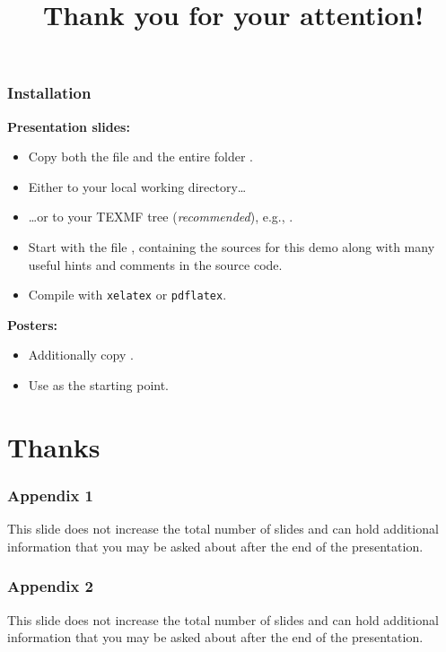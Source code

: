 \documentclass[11pt,t,usepdftitle=false,aspectratio=169]{beamer}
\begin{document}
\begin{frame}[fragile]
\frametitle{Installation}

   \textbf{Presentation slides:}
   \begin{itemize}
      \item Copy both the file  and the entire folder .

      \item Either to your local working directory\dots

      \item \dots or to your TEXMF tree (\emph{recommended}), e.g., .

      \item Start with the file , containing the sources for this demo
        along with many useful hints and comments in the source code.

      \item Compile with \texttt{xelatex} or \texttt{pdflatex}.
   \end{itemize}

\medskip

   \textbf{Posters:}
   \begin{itemize}
      \item Additionally copy .
      \item Use  as the starting point.
   \end{itemize}

\end{frame}


\title{Thank you for your attention!}
\subtitle{}
\section{Thanks}


\appendix

\begin{frame}
\frametitle{Appendix 1}
    This slide does not increase the total number of slides and can hold additional information
    that you may be asked about after the end of the presentation.
\end{frame}

\begin{frame}
\frametitle{Appendix 2}
    This slide does not increase the total number of slides and can hold additional information
    that you may be asked about after the end of the presentation.
\end{frame}
\end{document}
